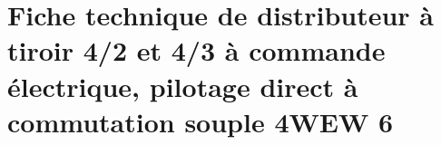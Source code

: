 

\lhead[\fancyplain{}{\leftmark}]%
      {\fancyplain{}{}} %
\chead[\fancyplain{}{}]%
      {\fancyplain{}{}}
\rhead[\fancyplain{}{}]%
      {\fancyplain{}{\rightmark}}%
\lfoot[\fancyplain{}{}]%
      {\fancyplain{}{}}
\cfoot[\fancyplain{}{\thepage}]%
      {\fancyplain{}{\thepage}} %
\rfoot[\fancyplain{}{}]%
     {\fancyplain{}{\scriptsize}}



\chapter{Fiche technique de distributeur à tiroir 4/2 et 4/3 à commande électrique, pilotage direct à commutation souple 4WEW 6}
\label{Ann:3 Fiche technique disctributeur Hydrac}

\minitoc
\newpage

